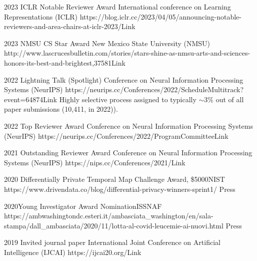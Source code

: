 \begin{awards}
	\awardentry
	{2023}
	{ICLR Notable Reviewer Award}%
	{International conference on Learning Representations (ICLR)} 
	{https://blog.iclr.cc/2023/04/05/announcing-notable-reviewers-and-area-chairs-at-iclr-2023/}{Link}

	\awardentry
	{2023}
	{NMSU CS Star Award}%
	{New Mexico State University (NMSU)} 
	{http://www.lascrucesbulletin.com/stories/stars-shine-as-nmsu-arts-and-sciences-honors-its-best-and-brightest,37581}{Link}


	\awardentryD
	{2022}
	{Lightning Talk (Spotlight)}%
	{Conference on Neural Information Processing Systems (NeurIPS)} 
	{https://neurips.cc/Conferences/2022/ScheduleMultitrack?event=64874}{Link}
	{Highly selective process assigned to typically $\sim$3\% out of all paper submissions (10,411, in 2022)).}

	\awardentry
	{2022}
	{Top Reviewer Award}%
	{Conference on Neural Information Processing Systems (NeurIPS)} 
	{https://neurips.cc/Conferences/2022/ProgramCommittee}{Link}

	\awardentry
	{2021}
	{Outstanding Reviewer Award}%
	{Conference on Neural Information Processing Systems (NeurIPS)} 
	{https://nips.cc/Conferences/2021/}{Link}

	\awardentry
	{2020}
	{Differentially Private Temporal Map Challenge Award, \$5000}{NIST}
	{https://www.drivendata.co/blog/differential-privacy-winners-sprint1/}
	{Press}

\awardentry
  	{2020}{Young Investigator Award Nomination}{ISSNAF} 
	{https://ambwashingtondc.esteri.it/ambasciata\_washington/en/sala-stampa/dall\_ambasciata/2020/11/lotta-al-covid-leucemie-ai-nuovi.html}
	{Press}

	\awardentry
	{2019}
	{Invited journal paper}%
	{International Joint Conference on Artificial Intelligence (IJCAI)}
	{https://ijcai20.org/}{Link}


\end{awards}
